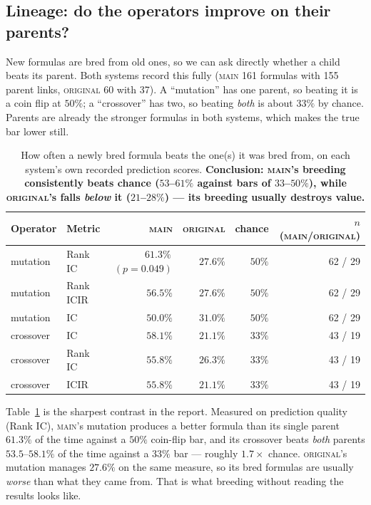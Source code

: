 \documentclass[11pt]{article}
\newcommand{\main}{\textsc{main}}
\newcommand{\orig}{\textsc{original}}
\begin{document}
\subsection{Lineage: do the operators improve on their parents?}

New formulas are bred from old ones, so we can ask directly whether a child beats its
parent. Both systems record this fully (\main{} 161 formulas with 155 parent links,
\orig{} 60 with 37). A ``mutation'' has one parent, so beating it is a coin flip at
$50\%$; a ``crossover'' has two, so beating \emph{both} is about $33\%$ by chance.
Parents are already the stronger formulas in both systems, which makes the true bar
lower still.

\begin{table}[h]
\centering\small
\begin{tabular}{llrrrr}
\toprule
Operator & Metric & \main{} & \orig{} & chance & $n$ (\main{}/\orig{}) \\
\midrule
mutation  & Rank IC   & $\bm{61.3\%}$\,$(p{=}0.049)$ & $27.6\%$ & $50\%$ & 62 / 29 \\
mutation  & Rank ICIR & $56.5\%$ & $27.6\%$ & $50\%$ & 62 / 29 \\
mutation  & IC        & $50.0\%$ & $31.0\%$ & $50\%$ & 62 / 29 \\
\midrule
crossover & IC        & $\bm{58.1\%}$ & $21.1\%$ & $33\%$ & 43 / 19 \\
crossover & Rank IC   & $\bm{55.8\%}$ & $26.3\%$ & $33\%$ & 43 / 19 \\
crossover & ICIR      & $\bm{55.8\%}$ & $21.1\%$ & $33\%$ & 43 / 19 \\
\bottomrule
\end{tabular}
\caption{How often a newly bred formula beats the one(s) it was bred from, on each
system's own recorded prediction scores. \textbf{Conclusion: \main{}'s breeding
consistently beats chance ($53$--$61\%$ against bars of $33$--$50\%$), while \orig{}'s
falls \emph{below} it ($21$--$28\%$) --- its breeding usually destroys value.}}
\label{tab:lineage}
\end{table}

\noindent Table~\ref{tab:lineage} is the sharpest contrast in the report. Measured on
prediction quality (Rank IC), \main{}'s mutation produces a better formula than its
single parent $61.3\%$ of the time against a $50\%$ coin-flip bar, and its crossover
beats \emph{both} parents $53.5$--$58.1\%$ of the time against a $33\%$ bar --- roughly
$1.7\times$ chance. \orig{}'s mutation manages $27.6\%$ on the same measure, so its
bred formulas are usually \emph{worse} than what they came from. That is what breeding
without reading the results looks like.
\end{document}
